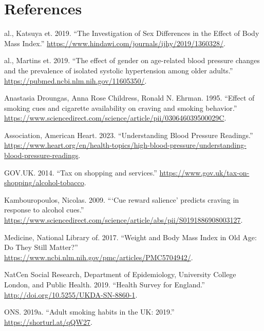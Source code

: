 \documentclass[
  11pt,
  twocolumn]{article}
\newlength{\cslhangindent}
\newlength{\cslentryspacingunit} %
\newenvironment{CSLReferences}[2] %
 {%
  \setlength{\parindent}{0pt}
  \ifodd #1
  \let\oldpar\par
  \def\par{\hangindent=\cslhangindent\oldpar}
  \fi
  \setlength{\parskip}{#2\cslentryspacingunit}
 }%
 {}
\begin{document}
\hypertarget{references}{%
\section*{References}\label{references}}

\hypertarget{refs}{}
\begin{CSLReferences}{1}{0}
\leavevmode{}%
al., Katsuya et. 2019. {``{The Investigation of Sex Differences in the
Effect of Body Mass Index}.''}
\url{https://www.hindawi.com/journals/ijhy/2019/1360328/}.

\leavevmode{}%
al., Martins et. 2019. {``{The effect of gender on age-related blood
pressure changes and the prevalence of isolated systolic hypertension
among older adults}.''} \url{https://pubmed.ncbi.nlm.nih.gov/11605350/}.

\leavevmode{}%
Anastasia Droungas, Anna Rose Childress, Ronald N. Ehrman. 1995.
{``{Effect of smoking cues and cigarette availability on craving and
smoking behavior}.''}
\url{https://www.sciencedirect.com/science/article/pii/030646039500029C}.

\leavevmode{}%
Association, American Heart. 2023. {``{Understanding Blood Pressure
Readings}.''}
\url{https://www.heart.org/en/health-topics/high-blood-pressure/understanding-blood-pressure-readings}.

\leavevmode{}%
GOV.UK. 2014. {``{Tax on shopping and services}.''}
\url{https://www.gov.uk/tax-on-shopping/alcohol-tobacco}.

\leavevmode{}%
Kambouropoulos, Nicolas. 2009. {``{{`Cue reward salience'} predicts
craving in response to alcohol cues}.''}
\url{https://www.sciencedirect.com/science/article/abs/pii/S0191886908003127}.

\leavevmode{}%
Medicine, National Library of. 2017. {``{Weight and Body Mass Index in
Old Age: Do They Still Matter?}''}
\url{https://www.ncbi.nlm.nih.gov/pmc/articles/PMC5704942/}.

\leavevmode{}%
NatCen Social Research, Department of Epidemiology, University College
London, and Public Health. 2019. {``{Health Survey for England}.''}
\url{http://doi.org/10.5255/UKDA-SN-8860-1}.

\leavevmode{}%
ONS. 2019a. {``{Adult smoking habits in the UK: 2019}.''}
\url{https://shorturl.at/qQW27}.


\end{CSLReferences}
\end{document}
